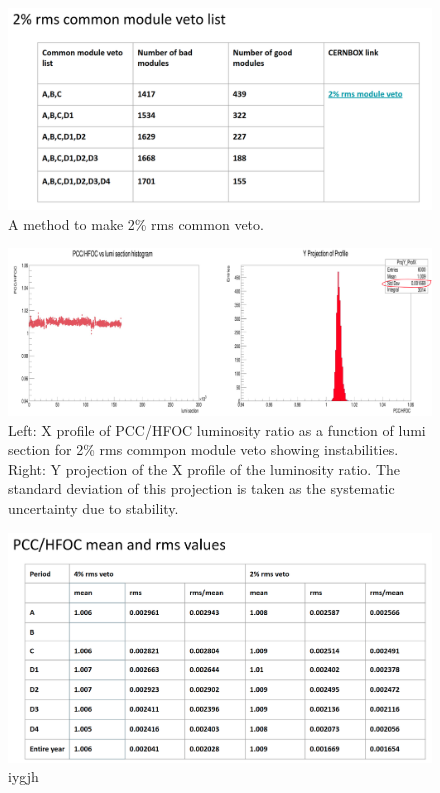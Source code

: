 \begin{figure}[!htp]
\centering
\includegraphics[width=1\textwidth]{ashish_thesis/2per_rms_common_veto.png}
\caption{%
   A method to make 2\% rms common veto.
}
\label{fig:2per common veto}
\end{figure}

\begin{figure}[!htp]
\centering
\includegraphics[width=1\textwidth]{ashish_thesis/pcc_hfoc_ratio_stability_2per_common_veto.png}
\caption{%
   Left: X profile of PCC/HFOC luminosity ratio as a function of lumi section for 2\% rms commpon module veto showing instabilities.  Right: Y projection of the X profile of the luminosity ratio. The standard deviation of this projection is taken as the systematic uncertainty due to stability.
}
\label{fig:2per common veto pcc hfoc}
\end{figure}

    
\begin{figure}[!htp]
\centering
\includegraphics[width=1\textwidth]{ashish_thesis/pcc_hfoc_4_2_rms_mean.png}
\caption{%
  iygjh
}
\label{fig:twoper common veto pcc hfoc rms mean}
\end{figure}


